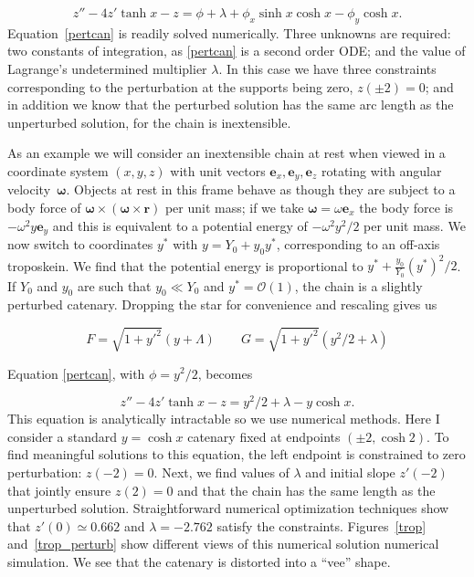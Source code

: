 \documentclass[pdflatex,sn-mathphys-num]{sn-jnl}%
\theoremstyle{thmstyleone}%
\theoremstyle{thmstyletwo}%
\theoremstyle{thmstylethree}%
\begin{document}
\begin{equation}\label{pertcan}
  z'' - 4z'\tanh x - z =
  \phi + \lambda + \phi_x\sinh x\cosh x - \phi_y\cosh x.
\end{equation}
%
Equation~\ref{pertcan} is readily solved numerically.  Three unknowns
are required: two constants of integration, as \ref{pertcan} is a
second order ODE; and the value of Lagrange's undetermined multiplier
$\lambda$.  In this case we have three constraints corresponding to
the perturbation at the supports being zero, $z(\pm 2)=0$; and in
addition we know that the perturbed solution has the same arc length
as the unperturbed solution, for the chain is inextensible.

As an example we will consider an inextensible chain at rest when
viewed in a coordinate system $(x,y,z)$ with unit vectors
$\boldsymbol{e}_x,\boldsymbol{e}_y,\boldsymbol{e}_z$ rotating with
angular velocity~$\boldsymbol{\omega}$.  Objects at rest in this frame
behave as though they are subject to a body force of
$\boldsymbol{\omega}\times\left(\boldsymbol{\omega}\times\boldsymbol{r}\right)$
per unit mass; if we take $\boldsymbol{\omega}=\omega\boldsymbol{e}_x$
the body force is $-\omega^2y\boldsymbol{e}_y$ and this is equivalent
to a potential energy of $-\omega^2y^2/2$ per unit mass.  We now
switch to coordinates $y^*$ with $y = Y_0 + y_0y^*$, corresponding to
an off-axis troposkein.  We find that the potential energy is
proportional to $y^*+\frac{y_0}{Y_0}\left(y^*\right)^2/2$.  If $Y_0$
and $y_0$ are such that $y_0\ll Y_0$ and $y^*={\mathcal O}(1)$, the
chain is a slightly perturbed catenary.  Dropping the star for
convenience and rescaling gives us

\begin{equation}
  F = \sqrt{1+y'^2}(y+\Lambda)\qquad
  G = \sqrt{1+y'^2}(y^2/2 + \lambda)
\end{equation}

Equation \ref{pertcan}, with $\phi=y^2/2$, becomes

\begin{equation}
  z'' - 4z'\tanh x - z = y^2/2 + \lambda -y\cosh x.
\end{equation}
%
This equation is analytically intractable so we use numerical methods.
Here I consider a standard $y=\cosh x$ catenary fixed at endpoints
$(\pm 2, \cosh 2)$.  To find meaningful solutions to this equation,
the left endpoint is constrained to zero perturbation: $z(-2)=0$.
Next, we find values of $\lambda$ and initial slope $z'(-2)$ that
jointly ensure $z(2)=0$ and that the chain has the same length as the
unperturbed solution.  Straightforward numerical optimization
techniques show that $z'(0)\simeq 0.662$ and $\lambda = -2.762$ satisfy
the constraints.  Figures~\ref{trop} and~\ref{trop_perturb} show
different views of this numerical solution numerical simulation.  We
see that the catenary is distorted into a ``vee'' shape.
\end{document}
